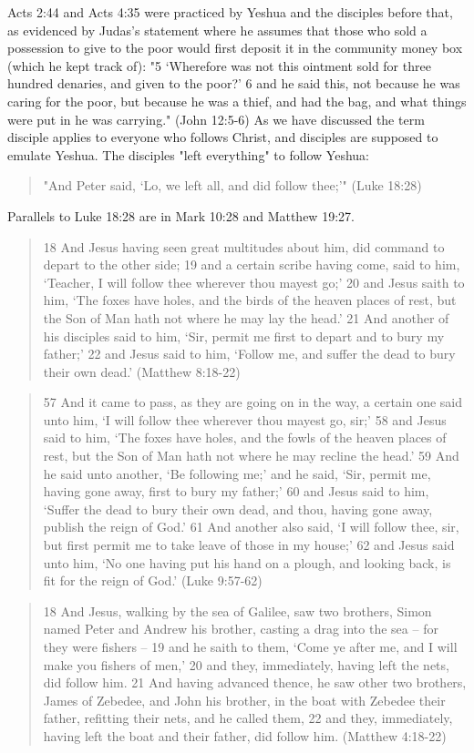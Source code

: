 \documentclass[11pt]{article}
\begin{document}
Acts 2:44 and Acts 4:35 were practiced by Yeshua and the disciples before that, as evidenced by Judas's statement where he assumes that those who sold a possession to give to the poor would first deposit it in the community money box (which he kept track of):
"5 `Wherefore was not this ointment sold for three hundred denaries, and given to the poor?' 6 and he said this, not because he was caring for the poor, but because he was a thief, and had the bag, and what things were put in he was carrying." (John 12:5-6) As we have discussed the term disciple applies to everyone who follows Christ, and disciples are supposed to emulate Yeshua. The disciples "left everything" to follow Yeshua: 
\begin{quote}
"And Peter said, `Lo, we left all, and did follow thee;'"
(Luke 18:28)
\end{quote}
Parallels to Luke 18:28 are in Mark 10:28 and Matthew 19:27.
\begin{quote}
18 And Jesus having seen great multitudes about him, did command to depart to the other side;
19 and a certain scribe having come, said to him, `Teacher, I will follow thee wherever thou mayest go;'
20 and Jesus saith to him, `The foxes have holes, and the birds of the heaven places of rest, but the Son of Man hath not where he may lay the head.'
21 And another of his disciples said to him, `Sir, permit me first to depart and to bury my father;'
22 and Jesus said to him, `Follow me, and suffer the dead to bury their own dead.' (Matthew 8:18-22)\end{quote}
\begin{quote}
57 And it came to pass, as they are going on in the way, a certain one said unto him, `I will follow thee wherever thou mayest go, sir;'
58 and Jesus said to him, `The foxes have holes, and the fowls of the heaven places of rest, but the Son of Man hath not where he may recline the head.'
59 And he said unto another, `Be following me;' and he said, `Sir, permit me, having gone away, first to bury my father;'
60 and Jesus said to him, `Suffer the dead to bury their own dead, and thou, having gone away, publish the reign of God.'
61 And another also said, `I will follow thee, sir, but first permit me to take leave of those in my house;'
62 and Jesus said unto him, `No one having put his hand on a plough, and looking back, is fit for the reign of God.' (Luke 9:57-62)\end{quote}
\begin{quote}
18 And Jesus, walking by the sea of Galilee, saw two brothers, Simon named Peter and Andrew his brother, casting a drag into the sea -- for they were fishers --
19 and he saith to them, `Come ye after me, and I will make you fishers of men,'
20 and they, immediately, having left the nets, did follow him.
21 And having advanced thence, he saw other two brothers, James of Zebedee, and John his brother, in the boat with Zebedee their father, refitting their nets, and he called them,
22 and they, immediately, having left the boat and their father, did follow him.
(Matthew 4:18-22)\end{quote}
\end{document}
